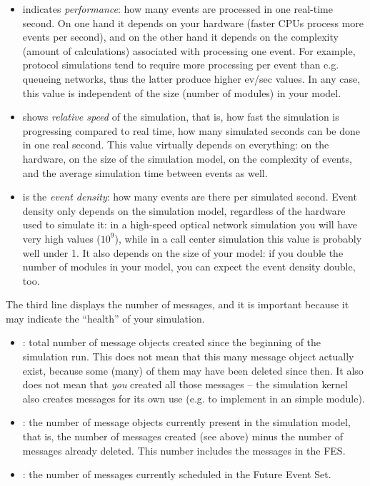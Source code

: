 \begin{itemize}
   \item {} indicates \textit{performance}: how many events are
     processed in one real-time second.  On one hand it depends on your hardware
     (faster CPUs process more events per second), and on the other hand
     it depends on the complexity (amount of calculations) associated
     with processing one event. For example, protocol simulations tend to require
     more processing per event than e.g. queueing networks, thus
     the latter produce higher ev/sec values.
     In any case, this value is independent of the size (number of modules) in your model.
   \item {} shows \textit{relative speed} of the simulation, that
     is, how fast the simulation is progressing compared to real time, how many
     simulated seconds can be done in one real second. This value virtually depends
     on everything: on the hardware, on the size of the simulation model,
     on the complexity of events, and the average simulation time between events as well.
   \item {} is the \textit{event density}: how many events are
     there per simulated second. Event density only depends on the simulation model,
     regardless of the hardware used to simulate it: in a high-speed
     optical network simulation you will have very high values ($10^9$), 
     while in a call center simulation this value is probably well
     under 1. It also depends on the size of your model: if you double the
     number of modules in your model, you can expect the event density double, too.
\end{itemize}

The third line displays the number of messages, and it is important
because it may indicate the ``health'' of your simulation.

\begin{itemize}
   \item{: total number of message objects created since the
     beginning of the simulation run. This does not mean that this many message
     object actually exist, because some (many) of them may have been deleted
     since then. It also does not mean that \textit{you} created all those
     messages -- the simulation kernel also creates messages for its own use
     (e.g. to implement  in an  simple module).}
   \item{: the number of message objects currently present
     in the simulation model, that is, the number of messages created (see above)
     minus the number of messages already deleted. This number includes
     the messages in the FES.}
   \item{: the number of messages currently scheduled in the
     Future Event Set.}
\end{itemize}


